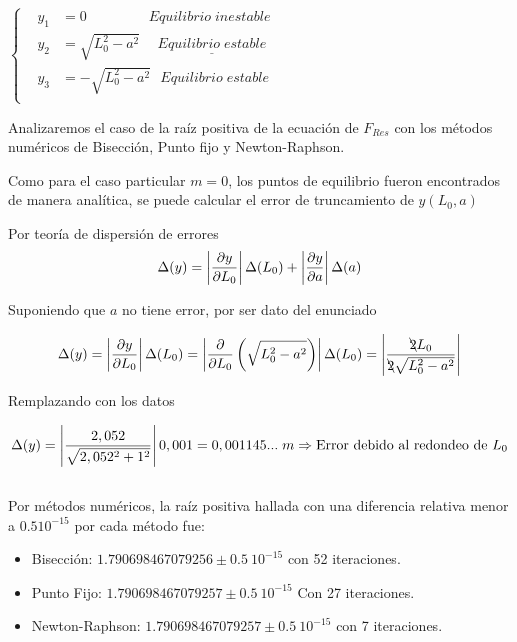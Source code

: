 \documentclass[10pt,a4paper]{article}
\begin{document}
\begin{centering}
$\left\{
\begin{array}{rcl}
      &y_{1}&=0     \hspace{53pt} Equilibrio\;inestable\\[7pt]
      &y_{2}&=\sqrt{L_{0}^{2}-a^{2}}  \hspace{15pt}    \underline{Equilibrio\;estable}\\[7pt]
      &y_{3}&= -\sqrt{L_{0}^{2}-a^{2}}  \hspace{8pt}   Equilibrio\;estable\\
\end{array}\right. $\\[10pt]
\end{centering}

Analizaremos el caso de la raíz positiva de la ecuación de $F_{Res}$ con los métodos numéricos de Bisección, Punto fijo y Newton-Raphson.

Como para el caso particular $m=0$, los puntos de equilibrio fueron encontrados de manera analítica, se puede calcular el error de truncamiento de $y(L_{0},a)$

Por teoría de dispersión de errores
\begin{equation}
\notag \Delta(y)= \left|\dfrac{\partial y}{\partial L_{0}}\right| \Delta(L_{0})+ \left|\dfrac{\partial y}{\partial a}\right| \Delta(a)
\end{equation}

Suponiendo que $a$ no tiene error, por ser dato del enunciado 

\begin{equation}
\notag \Delta(y)= \left|\dfrac{\partial y}{\partial L_{0}}\right| \Delta(L_{0}) =\left|\dfrac{\partial}{\partial L_{0}} \left(\sqrt{L_{0}^{2}-a^{2}}\right)\right|\Delta(L_{0})=\left| \dfrac{\bcancel{2}L_{0}}{\bcancel{2}\sqrt{L_{0}^{2}-a^{2}}} \right|
\end{equation}

Remplazando con los datos

\begin{equation}
\notag \Delta (y)=\left|\dfrac{2,052}{\sqrt{2,052^{2}+1^{2}}}\right|0,001=0,001145...\;m\Rightarrow \text{Error debido al redondeo de } L_{0}
\end{equation}
\\

Por métodos numéricos, la raíz positiva hallada con una diferencia relativa menor a $0.5 10^{-15}$ por cada método fue:

\begin{itemize}
\item Bisección: $1.790698467079256 \pm 0.5\:10^{-15}$ con 52 iteraciones.
\item Punto Fijo: $1.790698467079257 \pm 0.5\:10^{-15}$ Con  27 iteraciones.
\item Newton-Raphson: $1.790698467079257 \pm 0.5\:10^{-15}$ con 7 iteraciones.
\end{itemize}
\end{document}
